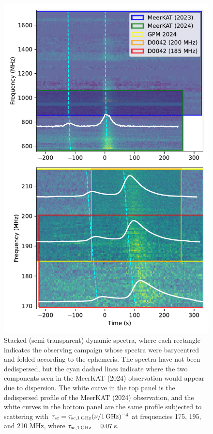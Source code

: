 \documentclass[preprint2,linenumbers]{aastex631}
\begin{document}
\begin{figure}[th]
    \centering
    \includegraphics[width=0.95\linewidth]{stacked_spectra.pdf}
    \caption{Stacked (semi-transparent) dynamic spectra, where each rectangle indicates the observing campaign whose spectra were barycentred and folded according to the ephemeris. The spectra have not been dedispersed, but the cyan dashed lines indicate where the two components seen in the MeerKAT (2024) observation would appear due to dispersion. The white curve in the top panel is the dedispersed profile of the MeerKAT (2024) observation, and the white curves in the bottom panel are the same profile subjected to scattering with $\tau_{\rm sc} = \tau_{\rm sc,1\,GHz} (\nu/{\rm 1\,GHz})^{-4}$ at frequencies 175, 195, and 210 MHz, where $\tau_{\rm sc,1\,GHz} = 0.07\,$s.}
    \label{fig:stacked_spectra}
\end{figure}
\end{document}
